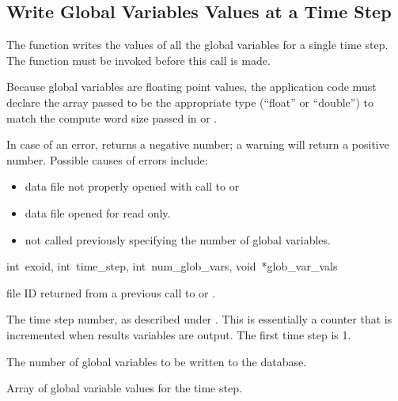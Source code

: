 \subsection{Write Global Variables Values at a Time Step}

The function  writes the values of all the
global variables for a single time step. The function
 must be invoked before this call is made.

Because global variables are floating point values, the application
code must declare the array passed to be the appropriate type
(``float'' or ``double'') to match the compute word size passed in
 or .

In case of an error,  returns a negative
number; a warning will return a positive number. Possible causes of
errors include:

\begin{itemize}
 \item data file not properly opened with call to 
 or 

 \item data file opened for read only.

 \item {} not called previously specifying
 the number of global variables.
\end{itemize}

{int~exoid,
int~time_step,
int~num_glob_vars,
void~*glob_var_vals}

\begin{parameters}
\item[{int exoid \R{}}]
\exo{} file ID returned from a previous call to 
or .

\item[{int time_step \R{}}]
The time step number, as described under .
This is essentially a counter that is incremented when results
variables are output. The first time step is 1.

\item[{int num_glob_vars \R{}}]
The number of global variables to be written to the database.

\item[{void* glob_var_vals \R{}}]
Array of  global variable values for
the \th{} time step.
\end{parameters}

